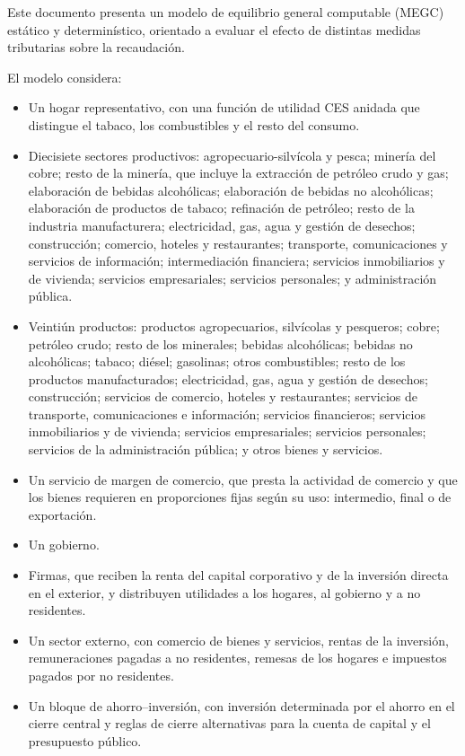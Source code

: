 \documentclass[11pt]{article}
\begin{document}
Este documento presenta un modelo de equilibrio general computable (MEGC) estático y determinístico, orientado a evaluar el efecto de distintas medidas tributarias sobre la recaudación.

El modelo considera:

\begin{itemize}
  \item Un hogar representativo, con una función de utilidad CES anidada que distingue el tabaco, los combustibles y el resto del consumo.
  \item Diecisiete sectores productivos: agropecuario-silvícola y pesca; minería del cobre; resto de la minería, que incluye la extracción de petróleo crudo y gas; elaboración de bebidas alcohólicas; elaboración de bebidas no alcohólicas; elaboración de productos de tabaco; refinación de petróleo; resto de la industria manufacturera; electricidad, gas, agua y gestión de desechos; construcción; comercio, hoteles y restaurantes; transporte, comunicaciones y servicios de información; intermediación financiera; servicios inmobiliarios y de vivienda; servicios empresariales; servicios personales; y administración pública.
  \item Veintiún productos: productos agropecuarios, silvícolas y pesqueros; cobre; petróleo crudo; resto de los minerales; bebidas alcohólicas; bebidas no alcohólicas; tabaco; diésel; gasolinas; otros combustibles; resto de los productos manufacturados; electricidad, gas, agua y gestión de desechos; construcción; servicios de comercio, hoteles y restaurantes; servicios de transporte, comunicaciones e información; servicios financieros; servicios inmobiliarios y de vivienda; servicios empresariales; servicios personales; servicios de la administración pública; y otros bienes y servicios.
  \item Un servicio de margen de comercio, que presta la actividad de comercio y que los bienes requieren en proporciones fijas según su uso: intermedio, final o de exportación.
  \item Un gobierno.
  \item Firmas, que reciben la renta del capital corporativo y de la inversión directa en el exterior, y distribuyen utilidades a los hogares, al gobierno y a no residentes.
  \item Un sector externo, con comercio de bienes y servicios, rentas de la inversión, remuneraciones pagadas a no residentes, remesas de los hogares e impuestos pagados por no residentes.
  \item Un bloque de ahorro--inversión, con inversión determinada por el ahorro en el cierre central y reglas de cierre alternativas para la cuenta de capital y el presupuesto público.

\end{itemize}
\end{document}
